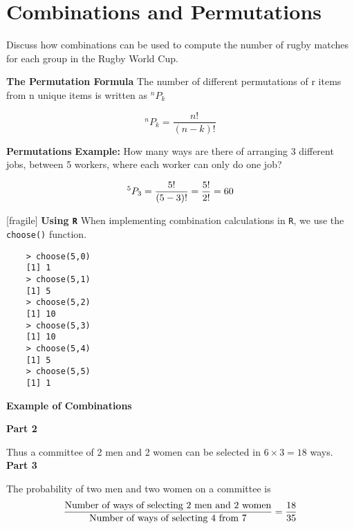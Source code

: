 \documentclass[]{report}
\begin{document}
	
	
	\section{ Combinations and Permutations }
	
	
	

	{

		
		\bigskip
		Discuss how combinations can be used to compute the number of rugby matches for each group in the Rugby World Cup.
		

		\textbf{The Permutation Formula}
		The number of different permutations of r items from n unique items is written as $^n P_k$
		
		
		\[ ^n P_k = \frac{n!}{(n-k)!}\]
	}
	
	{
		\textbf{Permutations}
		\textbf{Example:}
		How many ways are there of arranging 3 different jobs, between 5 workers, where each worker can only do one job?
		
		
		\[ ^5 P_3 = \frac{5!}{(5-3)!}  = {5! \over 2!} = 60\]
		
	}
	
	

	
	
	[fragile]
	\textbf{Using \texttt{R}}
	When implementing combination calculations in \texttt{R}, we use the \texttt{choose()} function.
	
	\begin{verbatim}
	> choose(5,0)
	[1] 1
	> choose(5,1)
	[1] 5
	> choose(5,2)
	[1] 10
	> choose(5,3)
	[1] 10
	> choose(5,4)
	[1] 5
	> choose(5,5)
	[1] 1
	\end{verbatim}
	
	
	{
		\textbf{Example of Combinations}
		
		\textbf{Part 2}
		
		Thus a committee of 2 men and 2 women can be selected in $ 6 \times 3  = 18 $ ways.\\
		\bigskip
		\textbf{Part 3}
		
		The probability of two men and two women on a committee is
		\[ {\mbox{Number of ways of selecting 2 men and 2 women} \over \mbox{Number of ways of selecting 4 from 7}} = {18 \over 35 }\]
		
	}
\end{document}
